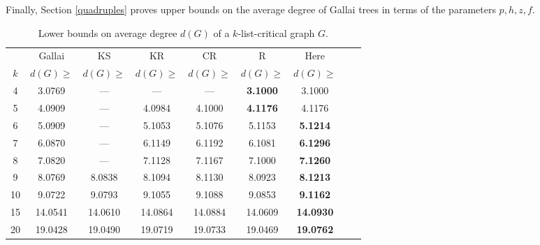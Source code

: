 \documentclass[12pt]{article}
\theoremstyle{plain}
\theoremstyle{definition}
\theoremstyle{remark}
\begin{document}
Finally, Section \ref{quadruples} proves upper bounds on the average degree of Gallai trees in terms of the parameters $p,h,z,f$.
\begin{table}
	\begin{center}
		\begin{tabular}{|c|c|c|c|c|c|c|c|c|}
			\hline
			& Gallai \cite{gallai1963kritische}
			& KS \cite{kostochkastiebitzedgesincriticalgraph} 
			& KR \cite{OreVizing}
			& CR \cite{DischargingLowerBound}
			& R \cite{Better4ListCriticalBound}
			& Here \\
			$k$ & $d(G) \ge$ & $d(G) \ge$ & $d(G) \ge$ & $d(G) \ge$ & $d(G) \ge$ & $d(G) \ge$\\
			\hline 
			4 & 3.0769 & --- & --- & --- & \bf{3.1000} & 3.1000\\
			5 & 4.0909 & --- & 4.0984 & 4.1000 & \bf{4.1176} & 4.1176\\
			6 & 5.0909 & --- & 5.1053 & 5.1076 & 5.1153 & \bf{5.1214}\\
			7 & 6.0870 & --- & 6.1149 & 6.1192} & 6.1081 & \bf{6.1296}\\
			8 & 7.0820 & --- & 7.1128 & 7.1167} & 7.1000 & \bf{7.1260}\\
			9 & 8.0769 & 8.0838 & 8.1094 & 8.1130} & 8.0923 & \bf{8.1213}\\
			10 & 9.0722 & 9.0793 & 9.1055 & 9.1088} & 9.0853 & \bf{9.1162}\\
			15 & 14.0541 & 14.0610 & 14.0864 & 14.0884} & 14.0609 & \bf{14.0930}\\
			20 & 19.0428 & 19.0490 & 19.0719 & 19.0733} & 19.0469 & \bf{19.0762}\\
			\hline
		\end{tabular}
	\end{center}
	\caption{Lower bounds on average degree $d(G)$ of a $k$-list-critical graph $G$.}
	\label{TheTable}
\end{table}
\end{document}

